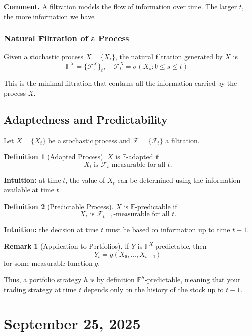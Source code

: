 \documentclass[12pt,a4paper]{article}
\theoremstyle{definition}
\newtheorem{definition}{Definition}[section]
\newtheorem{remark}{Remark}[section]
\begin{document}
\textbf{Comment.}
A filtration models the flow of information over time. The larger $t$, the more information we have.

\subsubsection{Natural Filtration of a Process}

Given a stochastic process $X = \{X_t\}$, the natural filtration generated by $X$ is
\[
\mathbb{F}^X = \{\mathcal{F}_t^X\}_t, \quad \mathcal{F}_t^X = \sigma(X_s : 0 \leq s \leq t).
\]

This is the minimal filtration that contains all the information carried by the process $X$.

\subsection{Adaptedness and Predictability}

Let $X = \{X_t\}$ be a stochastic process and $\mathcal{F} = \{\mathcal{F}_t\}$ a filtration.

\begin{definition}[Adapted Process]
$X$ is $\mathbb{F}$-adapted if
\[
X_t \text{ is } \mathcal{F}_t\text{-measurable for all } t.
\]
\end{definition}

\textbf{Intuition:} at time $t$, the value of $X_t$ can be determined using the information available at time $t$.

\begin{definition}[Predictable Process]
$X$ is $\mathbb{F}$-predictable if
\[
X_t \text{ is } \mathcal{F}_{t-1}\text{-measurable for all } t.
\]
\end{definition}

\textbf{Intuition:} the decision at time $t$ must be based on information up to time $t-1$.

\begin{remark}[Application to Portfolios]
If $Y$ is $\mathbb{F}^X$-predictable, then
\[
Y_t = g(X_0, \ldots, X_{t-1})
\]
for some measurable function $g$.

Thus, a portfolio strategy $h$ is by definition $\mathbb{F}^S$-predictable, meaning that your trading strategy at time $t$ depends only on the history of the stock up to $t-1$.
\end{remark}

\newpage
\section{September 25, 2025}
\end{document}
